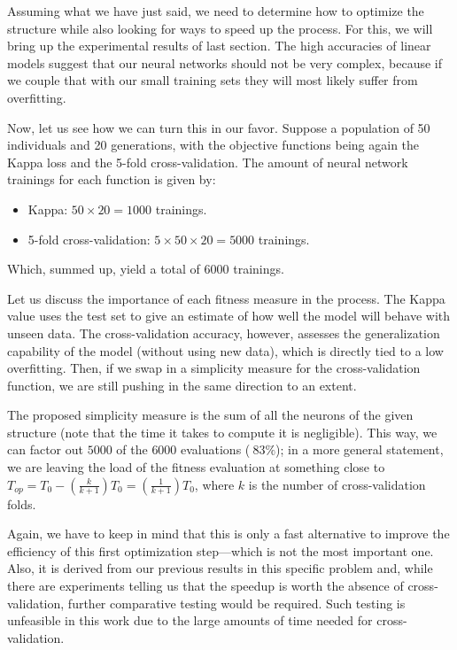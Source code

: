 	Assuming what we have just said, we need to determine how to optimize the structure while also looking for ways to speed up the process. For this, we will bring up the experimental results of last section. The high accuracies of linear models suggest that our neural networks should not be very complex, because if we couple that with our small training sets they will most likely suffer from overfitting.

\newpage

	Now, let us see how we can turn this in our favor. Suppose a population of 50 individuals and 20 generations, with the objective functions being again the Kappa loss and the 5-fold cross-validation. The amount of neural network trainings for each function is given by:

	\begin{itemize}

		\item
		Kappa: $50 \times 20 = 1000$ trainings.

		\item
		5-fold cross-validation: $5 \times 50 \times 20 = 5000$ trainings.

	\end{itemize}

	Which, summed up, yield a total of $6000$ trainings.

	Let us discuss the importance of each fitness measure in the process. The Kappa value uses the test set to give an estimate of how well the model will behave with unseen data. The cross-validation accuracy, however, assesses the generalization capability of the model (without using new data), which is directly tied to a low overfitting. Then, if we swap in a simplicity measure for the cross-validation function, we are still pushing in the same direction to an extent.

	The proposed simplicity measure is the sum of all the neurons of the given structure (note that the time it takes to compute it is negligible). This way, we can factor out $5000$ of the $6000$ evaluations ($~83\%$); in a more general statement, we are leaving the load of the fitness evaluation at something close to $T_{op} = T_0 -(\frac{k}{k+1})T_0 = (\frac{1}{k+1})T_0$, where $k$ is the number of cross-validation folds.

	Again, we have to keep in mind that this is only a fast alternative to improve the efficiency of this first optimization step---which is not the most important one. Also, it is derived from our previous results in this specific problem and, while there are experiments telling us that the speedup is worth the absence of cross-validation, further comparative testing would be required. Such testing is unfeasible in this work due to the large amounts of time needed for cross-validation.


